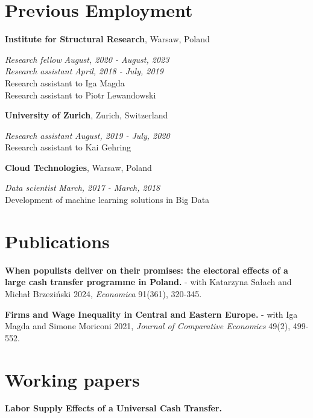 \documentclass[margin,line]{res}
\begin{document}
\begin{resume}
\section{\sc Previous Employment}

{\bf Institute for Structural Research}, Warsaw, Poland

\vspace{-.3cm}
{\em Research fellow} \hfill \textit{August, 2020 - August, 2023}\\
{\em Research assistant} \hfill \textit{April, 2018 - July, 2019}\\
Research assistant to Iga Magda\\ 
Research assistant to Piotr Lewandowski 
\vspace*{.05in} 

{\bf University of Zurich}, Zurich, Switzerland

\vspace{-.3cm}
{\em Research assistant} \hfill \textit{August, 2019 - July, 2020}\\
Research assistant to Kai Gehring
\vspace*{.05in}  

{\bf Cloud Technologies}, Warsaw, Poland

\vspace{-.3cm}
{\em Data scientist} \hfill \textit{March, 2017 - March, 2018}\\
Development of machine learning solutions in Big Data
\vspace*{.05in}  

\section{\sc Publications}
\textbf{When populists deliver on their promises: the electoral effects of a large cash transfer programme in Poland.} - with Katarzyna Sałach and Michał Brzeziński 2024, \textit{Economica} 91(361), 320-345.

\textbf{Firms and Wage Inequality in Central and Eastern Europe.} - with Iga Magda and Simone Moriconi 2021, \textit{Journal of Comparative Economics} 49(2), 499-552.
\vspace*{.05in}  

\section{\sc Working papers}

\textbf{Labor Supply Effects of a Universal Cash Transfer. }


\end{resume}
\end{document}
